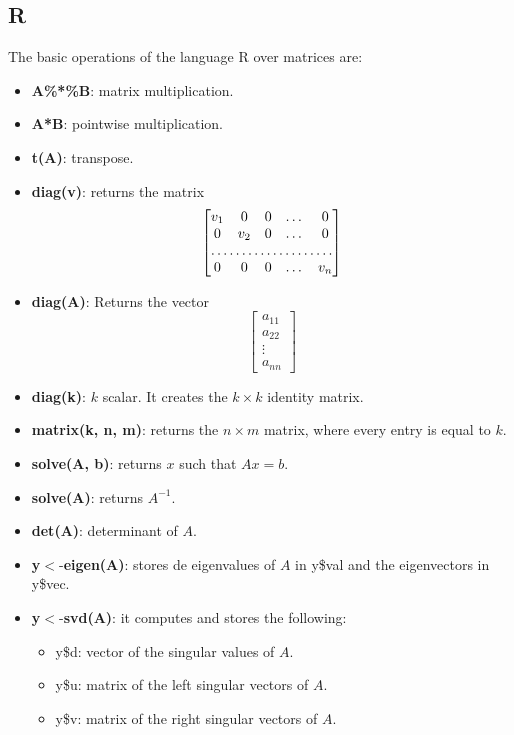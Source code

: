 \subsection*{R}

The basic operations of the language R over matrices are:

\begin{itemize}
	\item \textbf{A\%*\%B}: matrix multiplication.
	\item \textbf{A*B}: pointwise multiplication.
	\item \textbf{t(A)}: transpose.
	\item \textbf{diag(v)}: returns the matrix 
	\[
\begin{bmatrix}
    v_{1}       & 0 & 0 & \dots & 0 \\
    0       & v_{2} & 0 & \dots & 0 \\
    \hdotsfor{5} \\
    0       & 0 & 0 & \dots & v_{n}
\end{bmatrix}
\]
	\item \textbf{diag(A)}: Returns the vector
	\[
\begin{bmatrix}
    a_{11} \\
    a_{22} \\
    \vdots \\
    a_{nn}
\end{bmatrix}
\]
	\item \textbf{diag(k)}: $k$ scalar. It creates the $k\times k$ identity matrix.
	\item \textbf{matrix(k, n, m)}: returns the $n\times m$ matrix, where every entry is equal to $k$.
	\item \textbf{solve(A, b)}: returns $x$ such that $Ax=b$.
	\item \textbf{solve(A)}: returns $A^{-1}$.
	\item \textbf{det(A)}: determinant of $A$.
	\item \textbf{y}$<$-\textbf{eigen(A)}: stores de eigenvalues of $A$ in y\$val and the eigenvectors in y\$vec.
	\item \textbf{y}$<$-\textbf{svd(A)}: it computes and stores the following:
	\begin{itemize}
		\item y\$d: vector of the singular values of $A$.
		\item y\$u: matrix of the left singular vectors of $A$.
		\item y\$v: matrix of the right singular vectors of $A$.
	\end{itemize}

\end{itemize}
